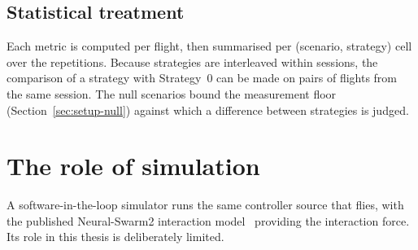 \subsection{Statistical treatment}
\label{sec:setup-stats}

Each metric is computed per flight, then summarised per (scenario, strategy) cell over the
repetitions. Because strategies are interleaved within sessions, the comparison of a strategy with
Strategy~0 can be made on pairs of flights from the same session. The null scenarios bound the
measurement floor (Section~\ref{sec:setup-null}) against which a difference between strategies is
judged.

\section{The role of simulation}
\label{sec:setup-sim}

A software-in-the-loop simulator runs the same controller source that flies, with the published
Neural-Swarm2 interaction model~\cite{shi2022neuralswarm2} providing the interaction force. Its role
in this thesis is deliberately limited.

